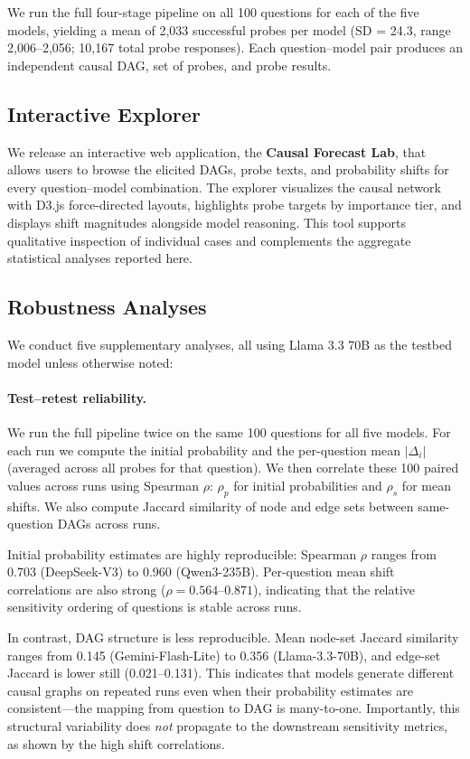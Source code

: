 \documentclass[11pt]{article}
\begin{document}
We run the full four-stage pipeline on all 100 questions for each of the five models, yielding a mean of 2,033 successful probes per model (SD = 24.3, range 2,006--2,056; 10,167 total probe responses). Each question--model pair produces an independent causal DAG, set of probes, and probe results.

\subsection{Interactive Explorer}

We release an interactive web application, the \textbf{Causal Forecast Lab}, that allows users to browse the elicited DAGs, probe texts, and probability shifts for every question--model combination. The explorer visualizes the causal network with D3.js force-directed layouts, highlights probe targets by importance tier, and displays shift magnitudes alongside model reasoning. This tool supports qualitative inspection of individual cases and complements the aggregate statistical analyses reported here.

\subsection{Robustness Analyses}

We conduct five supplementary analyses, all using Llama 3.3 70B as the testbed model unless otherwise noted:

\paragraph{Test--retest reliability.} We run the full pipeline twice on the same 100 questions for all five models. For each run we compute the initial probability and the per-question mean $|\Delta_i|$ (averaged across all probes for that question). We then correlate these 100 paired values across runs using Spearman $\rho$: $\rho_p$ for initial probabilities and $\rho_s$ for mean shifts. We also compute Jaccard similarity of node and edge sets between same-question DAGs across runs.

Initial probability estimates are highly reproducible: Spearman $\rho$ ranges from 0.703 (DeepSeek-V3) to 0.960 (Qwen3-235B). Per-question mean shift correlations are also strong ($\rho = 0.564$--$0.871$), indicating that the relative sensitivity ordering of questions is stable across runs.

In contrast, DAG structure is less reproducible. Mean node-set Jaccard similarity ranges from 0.145 (Gemini-Flash-Lite) to 0.356 (Llama-3.3-70B), and edge-set Jaccard is lower still (0.021--0.131). This indicates that models generate different causal graphs on repeated runs even when their probability estimates are consistent---the mapping from question to DAG is many-to-one. Importantly, this structural variability does \emph{not} propagate to the downstream sensitivity metrics, as shown by the high shift correlations.
\end{document}
